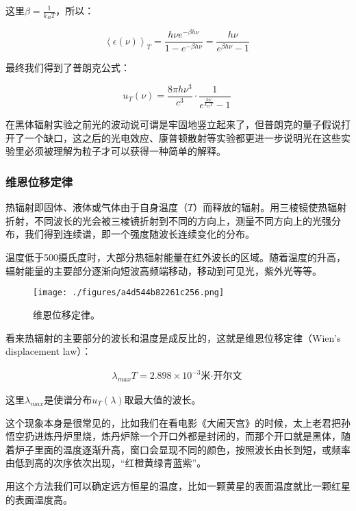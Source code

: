 这里$\beta = \frac{1}{k_B T}$，所以：

\begin{equation}
\left\langle \epsilon (\nu)  \right\rangle_T = \frac{ h \nu e^{- \beta h \nu } }{1 - e^{ - \beta h \nu }} = \frac{ h \nu  }{e^{\beta h \nu} - 1 }~
\end{equation}

最终我们得到了普朗克公式：

\begin{equation}
u_T (\nu )  = \frac{ 8 \pi h \nu^3  }{ c^3 } \cdot  \frac{1 }{ e^{ \frac{ h \nu }{ k_B T } }  - 1 }~
\end{equation}

在黑体辐射实验之前光的波动说可谓是牢固地竖立起来了，但普朗克的量子假说打开了一个缺口，这之后的光电效应、康普顿散射等实验都更进一步说明光在这些实验里必须被理解为粒子才可以获得一种简单的解释。

\subsubsection{维恩位移定律}

热辐射即固体、液体或气体由于自身温度（$T$）而释放的辐射。用三棱镜使热辐射折射，不同波长的光会被三棱镜折射到不同的方向上，测量不同方向上的光强分布，我们得到连续谱，即一个强度随波长连续变化的分布。

温度低于500摄氏度时，大部分热辐射能量在红外波长的区域。随着温度的升高，辐射能量的主要部分逐渐向短波高频端移动，移动到可见光，紫外光等等。

\begin{figure}[ht]
\centering
\texttt{[image: ./figures/a4d544b82261c256.png]}
\caption{ 维恩位移定律。} \label{fig_QMPre5_7}
\end{figure}

看来热辐射的主要部分的波长和温度是成反比的，这就是维恩位移定律（Wien's displacement law）：

\begin{align}
\text{$\lambda_{max} T = 2.898 \times 10^{-3 }$米·开尔文}~
\end{align}

这里$\lambda_{max}$是使谱分布$u_T(\lambda)$取最大值的波长。

这个现象本身是很常见的，比如我们在看电影《大闹天宫》的时候，太上老君把孙悟空扔进炼丹炉里烧，炼丹炉除一个开口外都是封闭的，而那个开口就是黑体，随着炉子里面的温度逐渐升高，窗口会显现不同的颜色，按照波长由长到短，或频率由低到高的次序依次出现，“红橙黄绿青蓝紫”。

用这个方法我们可以确定远方恒星的温度，比如一颗黄星的表面温度就比一颗红星的表面温度高。

